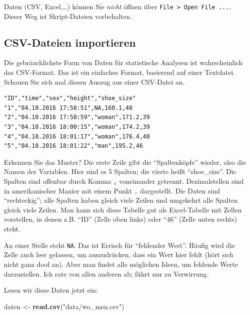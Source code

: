\documentclass[12pt,ngerman,]{book}
\newenvironment{Shaded}{\begin{snugshade}}{\end{snugshade}}
\newcommand{\KeywordTok}[1]{\textcolor[rgb]{0.13,0.29,0.53}{\textbf{{#1}}}}
\newcommand{\StringTok}[1]{\textcolor[rgb]{0.31,0.60,0.02}{{#1}}}
\newcommand{\NormalTok}[1]{{#1}}
\renewenvironment{Shaded}{\begin{kframe}}{\end{kframe}}
\let\BeginKnitrBlock\begin \let\EndKnitrBlock\end
\begin{document}
\BeginKnitrBlock{rmdcaution}
Daten (CSV, Excel,\ldots{}) können Sie \emph{nicht} öffnen über
\texttt{File\ \textgreater{}\ Open\ File\ ...}. Dieser Weg ist
Skript-Dateien vorbehalten.
\EndKnitrBlock{rmdcaution}

\subsection{CSV-Dateien importieren}\label{csv-dateien-importieren}

Die gebräuchlichste Form von Daten für statistische Analysen ist
wahrscheinlich das CSV-Format. Das ist ein einfaches Format, basierend
auf einer Textdatei. Schauen Sie sich mal diesen Auszug aus einer
CSV-Datei an.

\begin{verbatim}
"ID","time","sex","height","shoe_size"
"1","04.10.2016 17:58:51",NA,160.1,40
"2","04.10.2016 17:58:59","woman",171.2,39
"3","04.10.2016 18:00:15","woman",174.2,39
"4","04.10.2016 18:01:17","woman",176.4,40
"5","04.10.2016 18:01:22","man",195.2,46
\end{verbatim}

Erkennen Sie das Muster? Die erste Zeile gibt die ``Spaltenköpfe''
wieder, also die Namen der Variablen. Hier sind es 5 Spalten; die vierte
heißt ``shoe\_size''. Die Spalten sind offenbar durch Komma \texttt{,}
voneinander getrennt. Dezimalstellen sind in amerikanischer Manier mit
einem Punkt \texttt{.} dargestellt. Die Daten sind ``rechteckig''; alle
Spalten haben gleich viele Zeilen und umgekehrt alle Spalten gleich
viele Zeilen. Man kann sich diese Tabelle gut als Excel-Tabelle mit
Zellen vorstellen, in denen z.B. ``ID'' (Zelle oben links) oder ``46''
(Zelle unten rechts) steht.

An einer Stelle steht \texttt{NA}. Das ist Errisch für ``fehlender
Wert''. Häufig wird die Zelle auch leer gelassen, um auszudrücken, dass
ein Wert hier fehlt (hört sich nicht ganz doof an). Aber man findet alle
möglichen Ideen, um fehlende Werte darzustellen. Ich rate von allen
anderen ab; führt nur zu Verwirrung.

Lesen wir diese Daten jetzt ein:

\begin{Shaded}
\begin{Highlighting}[]
\NormalTok{daten <-}\StringTok{ }\KeywordTok{read.csv}\NormalTok{(}\StringTok{"data/wo_men.csv"}\NormalTok{)}
\end{Highlighting}
\end{Shaded}
\end{document}
